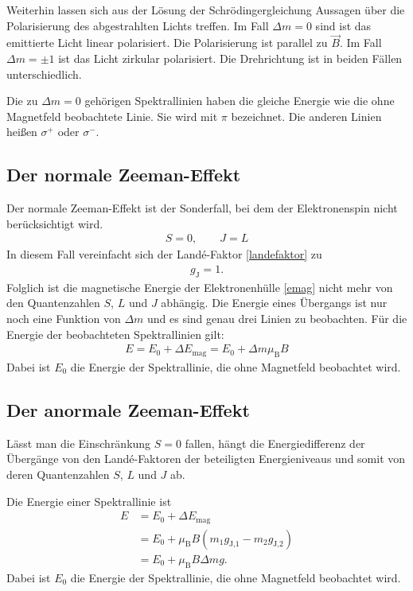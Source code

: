 Weiterhin lassen sich aus der Lösung der Schrödingergleichung Aussagen über die Polarisierung des abgestrahlten Lichts treffen.
Im Fall $\Delta m = 0$ sind ist das emittierte Licht linear polarisiert.
Die Polarisierung ist parallel zu $\vec{B}$.
Im Fall $\Delta m = \pm 1$ ist das Licht zirkular polarisiert.
Die Drehrichtung ist in beiden Fällen unterschiedlich.

Die zu $\Delta m = 0$ gehörigen Spektrallinien haben die gleiche Energie wie die ohne Magnetfeld beobachtete Linie.
Sie wird mit $\pi$ bezeichnet.
Die anderen Linien heißen $\sigma^+$ oder $\sigma^-$.

\subsection{Der normale Zeeman-Effekt}
Der normale Zeeman-Effekt ist der Sonderfall, bei dem der Elektronenspin nicht berücksichtigt wird.
\begin{align}
	S = 0, \quad \quad J = L
\end{align}
In diesem Fall vereinfacht sich der Landé-Faktor \eqref{landefaktor} zu
\begin{align}
	g_\text{J} = 1.
\end{align}
Folglich ist die magnetische Energie der Elektronenhülle \eqref{emag} nicht mehr von den Quantenzahlen $S$, $L$ und $J$ abhängig.
Die Energie eines Übergangs ist nur noch eine Funktion von $\Delta m$ und es sind genau drei Linien zu beobachten.
Für die Energie der beobachteten Spektrallinien gilt:
\begin{align}
	E = E_0 + \Delta E_\text{mag} =  E_0 + \Delta m \mu_\text{B} B
\end{align}
Dabei ist $E_0$ die Energie der Spektrallinie, die ohne Magnetfeld beobachtet wird.

\subsection{Der anormale Zeeman-Effekt}
Lässt man die Einschränkung $S = 0$ fallen, hängt die Energiedifferenz der Übergänge von den Landé-Faktoren der beteiligten Energieniveaus und somit von deren Quantenzahlen $S$, $L$ und $J$ ab.

Die Energie einer Spektrallinie ist
\begin{align}
	E &= E_0 + \Delta E_\text{mag} \\
	&= E_0 + \mu_\text{B} B \left(m_1 g_\text{J,1} - m_2 g_\text{J,2} \right) \\
	&= E_0 + \mu_\text{B} B \Delta mg.
\end{align}
Dabei ist $E_0$ die Energie der Spektrallinie, die ohne Magnetfeld beobachtet wird.

